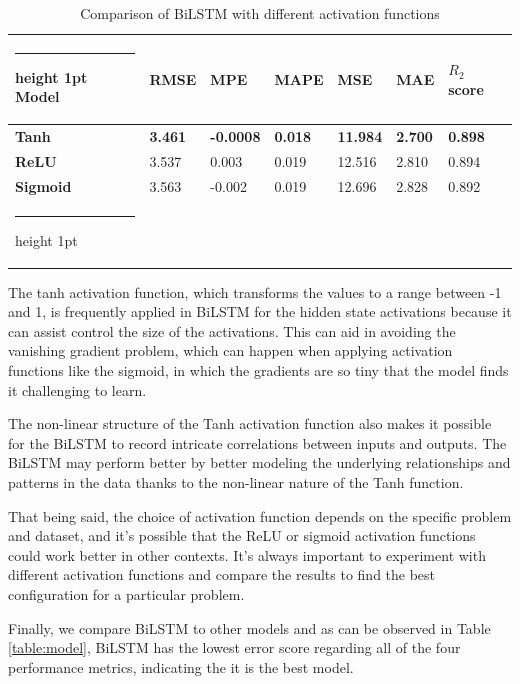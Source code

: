 \documentclass[a4paper]{article}
\makeatletter
\newcommand{\thickhline}{%
    \noalign {\ifnum 0=`}\fi \hrule height 1pt
    \futurelet \reserved@a \@xhline
}
\makeatother
\begin{document}
\begin{table}[!h]
\centering
\caption{Comparison of BiLSTM with different activation functions}
\label{table:af}
\vspace{5pt}
\begin{tabular}{lllllll}
\thickhline\textbf{Model} & \textbf{RMSE} & \textbf{MPE} & \textbf{MAPE} & \textbf{MSE} &\textbf{ MAE} & \textbf{$R_2$ score} \\ 
\hline
\textbf{Tanh} & \textbf{3.461} & \textbf{-0.0008} & \textbf{0.018} & \textbf{11.984} & \textbf{2.700} & \textbf{0.898} \\
\hline
\textbf{ReLU} & 3.537 & 0.003 & 0.019 & 12.516 & 2.810 & 0.894 \\
\textbf{Sigmoid} & 3.563 & -0.002 & 0.019 & 12.696 & 2.828 & 0.892 \\
\thickhline
\end{tabular}
\end{table}

The tanh activation function, which transforms the values to a range between -1 and 1, is frequently applied in BiLSTM for the hidden state activations because it can assist control the size of the activations. This can aid in avoiding the vanishing gradient problem, which can happen when applying activation functions like the sigmoid, in which the gradients are so tiny that the model finds it challenging to learn.

The non-linear structure of the Tanh activation function also makes it possible for the BiLSTM to record intricate correlations between inputs and outputs. The BiLSTM may perform better by better modeling the underlying relationships and patterns in the data thanks to the non-linear nature of the Tanh function.

That being said, the choice of activation function depends on the specific problem and dataset, and it's possible that the ReLU or sigmoid activation functions could work better in other contexts. It's always important to experiment with different activation functions and compare the results to find the best configuration for a particular problem.

Finally, we compare BiLSTM to other models and as can be observed in Table \ref{table:model}, BiLSTM has the lowest error score regarding all of the four performance metrics, indicating the it is the best model. 
\end{document}
